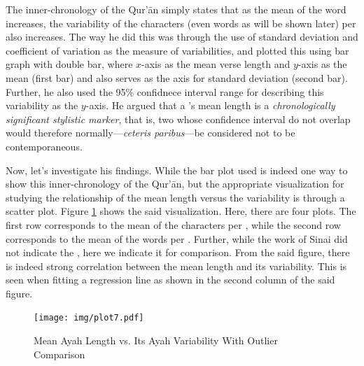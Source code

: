 The inner-chronology of the Qur'\=an simply states that as the mean of the word increases, the variability of the characters (even words as will be shown later) per   also increases. The way he did this was through the use of standard deviation and coefficient of variation as the measure of variabilities, and plotted this using bar graph with double bar, where $x$-axis as the mean verse length and $y$-axis as the mean (first bar) and also serves as the axis for standard deviation (second bar). Further, he also used the 95\% confidnece interval range for describing this variability as the $y$-axis. He argued that a 's  mean   length is a \textit{chronologically significant stylistic marker}, that is, two   whose confidence interval do not overlap would therefore normally---\textit{ceteris paribus}---be considered not to be contemporaneous. 

Now, let's investigate his findings. While the bar plot used is indeed one way to show this inner-chronology of the Qur'\=an, but the appropriate visualization for studying the relationship of the mean   length versus the   variability is through a scatter plot. Figure \ref{fig:result_sinai_chronology} shows the said visualization. Here, there are four plots. The first row corresponds to the mean of the characters per  , while the second row corresponds to the mean of the words per  . Further, while the work of Sinai did not indicate the  , here we indicate it for comparison. From the said figure, there is indeed strong correlation between the mean   length and its variability. This is seen when fitting a regression line as shown in the second column of the said figure.

\begin{figure}[!t]
    \centering
    \texttt{[image: img/plot7.pdf]}
    \caption{Mean Ayah Length vs. Its Ayah Variability With Outlier Comparison}
    \label{fig:result_sinai_chronology}
\end{figure}

